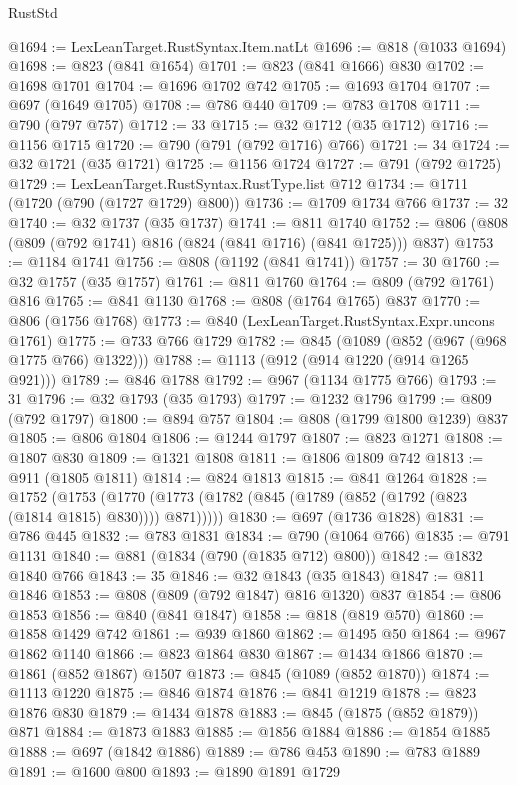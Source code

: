 \begin{lexlean}{RustStd}
\begin{coremodule}
@1694 := LexLeanTarget.RustSyntax.Item.natLt
@1696 := @818 (@1033 @1694)
@1698 := @823 (@841 @1654)
@1701 := @823 (@841 @1666) @830
@1702 := @1698 @1701
@1704 := @1696 @1702 @742
@1705 := @1693 @1704
@1707 := @697 (@1649 @1705)
@1708 := @786 @440
@1709 := @783 @1708
@1711 := @790 (@797 @757)
@1712 := 33
@1715 := @32 @1712 (@35 @1712)
@1716 := @1156 @1715
@1720 := @790 (@791 (@792 @1716) @766)
@1721 := 34
@1724 := @32 @1721 (@35 @1721)
@1725 := @1156 @1724
@1727 := @791 (@792 @1725)
@1729 := LexLeanTarget.RustSyntax.RustType.list @712
@1734 := @1711 (@1720 (@790 (@1727 @1729) @800))
@1736 := @1709 @1734 @766
@1737 := 32
@1740 := @32 @1737 (@35 @1737)
@1741 := @811 @1740
@1752 := @806 (@808 (@809 (@792 @1741) @816 (@824 (@841 @1716) (@841 @1725))) @837)
@1753 := @1184 @1741
@1756 := @808 (@1192 (@841 @1741))
@1757 := 30
@1760 := @32 @1757 (@35 @1757)
@1761 := @811 @1760
@1764 := @809 (@792 @1761) @816
@1765 := @841 @1130
@1768 := @808 (@1764 @1765) @837
@1770 := @806 (@1756 @1768)
@1773 := @840 (LexLeanTarget.RustSyntax.Expr.uncons @1761)
@1775 := @733 @766 @1729
@1782 := @845 (@1089 (@852 (@967 (@968 @1775 @766) @1322)))
@1788 := @1113 (@912 (@914 @1220 (@914 @1265 @921)))
@1789 := @846 @1788
@1792 := @967 (@1134 @1775 @766)
@1793 := 31
@1796 := @32 @1793 (@35 @1793)
@1797 := @1232 @1796
@1799 := @809 (@792 @1797)
@1800 := @894 @757
@1804 := @808 (@1799 @1800 @1239) @837
@1805 := @806 @1804
@1806 := @1244 @1797
@1807 := @823 @1271
@1808 := @1807 @830
@1809 := @1321 @1808
@1811 := @1806 @1809 @742
@1813 := @911 (@1805 @1811)
@1814 := @824 @1813
@1815 := @841 @1264
@1828 := @1752
    (@1753 (@1770 (@1773 (@1782 (@845 (@1789 (@852 (@1792 (@823 (@1814 @1815) @830)))) @871)))))
@1830 := @697 (@1736 @1828)
@1831 := @786 @445
@1832 := @783 @1831
@1834 := @790 (@1064 @766)
@1835 := @791 @1131
@1840 := @881 (@1834 (@790 (@1835 @712) @800))
@1842 := @1832 @1840 @766
@1843 := 35
@1846 := @32 @1843 (@35 @1843)
@1847 := @811 @1846
@1853 := @808 (@809 (@792 @1847) @816 @1320) @837
@1854 := @806 @1853
@1856 := @840 (@841 @1847)
@1858 := @818 (@819 @570)
@1860 := @1858 @1429 @742
@1861 := @939 @1860
@1862 := @1495 @50
@1864 := @967 @1862 @1140
@1866 := @823 @1864 @830
@1867 := @1434 @1866
@1870 := @1861 (@852 @1867) @1507
@1873 := @845 (@1089 (@852 @1870))
@1874 := @1113 @1220
@1875 := @846 @1874
@1876 := @841 @1219
@1878 := @823 @1876 @830
@1879 := @1434 @1878
@1883 := @845 (@1875 (@852 @1879)) @871
@1884 := @1873 @1883
@1885 := @1856 @1884
@1886 := @1854 @1885
@1888 := @697 (@1842 @1886)
@1889 := @786 @453
@1890 := @783 @1889
@1891 := @1600 @800
@1893 := @1890 @1891 @1729

\end{coremodule}
\end{lexlean}
